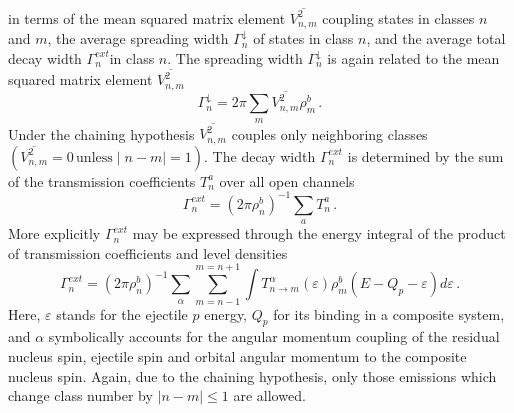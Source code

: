 \documentclass[twocolumn,amsmath,amssymb,10pt,groupedaddress,a4paper]{revtex4}
\begin{document}
in terms of the mean squared matrix element $\overline{V_{n,m}^{2}}$
coupling states in classes $n$ and $m$, the average spreading width
$\Gamma_{n}^{\downarrow}$ of states in class $n$, and the average
total decay width $\Gamma_{n}^{ext}$in class $n$. The spreading
width $\Gamma_{n}^{\downarrow}$ is again related to the mean squared
matrix element $\overline{V_{n,m}^{2}}$
\begin{equation}
\Gamma_{n}^{\downarrow}=2\pi\sum_{m}\overline{V_{n,m}^{2}}\rho_{m}^{b}\,.
\label{GdownMSC}
\end{equation}
Under the chaining hypothesis $\overline{V_{n,m}^{2}}$ couples only
neighboring classes $(\overline{V_{n,m}^{2}}=0\,{\textrm{unless}}\mid n-m\mid=1)$.
The decay width $\Gamma_{n}^{ext}$ is determined by the sum of the
transmission coefficients $T_{n}^{a}$ over all open channels
\begin{equation}
\Gamma_{n}^{ext}=(2\pi\rho_{n}^{b})^{-1}\sum_{a}T_{n}^{a}\,.
\end{equation}
More explicitly $\Gamma_{n}^{ext}$ may be expressed through the energy
integral of the product of transmission coefficients and level densities
\begin{equation}
\Gamma_{n}^{ext}=(2\pi\rho_{n}^{b})^{-1}\sum_{\alpha}\sum_{m=n-1}^{m=n+1}\int T_{n\rightarrow m}^{\alpha}(\varepsilon)\rho_{m}^{b}(E-Q_{p}-\varepsilon)d\varepsilon\,.
\label{Gammext}
\end{equation}
Here, $\varepsilon$ stands for the ejectile $p$ energy, $Q_{p}$
for its binding in a composite system, and $\alpha$ symbolically
accounts for the angular momentum coupling of the residual nucleus
spin, ejectile spin and orbital angular momentum to the composite
nucleus spin. Again, due to the chaining hypothesis, only those emissions
which change class number by $\mid n-m\mid\leq1$ are allowed.
\end{document}
